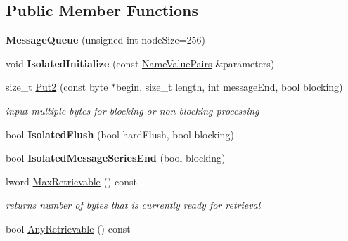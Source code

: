 \subsection*{Public Member Functions}
\begin{DoxyCompactItemize}
\item 
\hypertarget{class_message_queue_a99e63c7e22a03a87374a74880f75a586}{
{\bfseries MessageQueue} (unsigned int nodeSize=256)}
\label{class_message_queue_a99e63c7e22a03a87374a74880f75a586}

\item 
\hypertarget{class_message_queue_a26b8baf32ac98064caf0696fc37dcacf}{
void {\bfseries IsolatedInitialize} (const \hyperlink{class_name_value_pairs}{NameValuePairs} \&parameters)}
\label{class_message_queue_a26b8baf32ac98064caf0696fc37dcacf}

\item 
size\_\-t \hyperlink{class_message_queue_a3ca42e60e7de1cfada145609cb3eb5e9}{Put2} (const byte $\ast$begin, size\_\-t length, int messageEnd, bool blocking)
\begin{DoxyCompactList}\small\item\em input multiple bytes for blocking or non-\/blocking processing \item\end{DoxyCompactList}\item 
\hypertarget{class_message_queue_adf7c0e8cc64279572e4bfc282bcdba78}{
bool {\bfseries IsolatedFlush} (bool hardFlush, bool blocking)}
\label{class_message_queue_adf7c0e8cc64279572e4bfc282bcdba78}

\item 
\hypertarget{class_message_queue_a574f29031f2d8ae02e7ff4a03e5db8bf}{
bool {\bfseries IsolatedMessageSeriesEnd} (bool blocking)}
\label{class_message_queue_a574f29031f2d8ae02e7ff4a03e5db8bf}

\item 
lword \hyperlink{class_message_queue_a636d1842ab46a50cdb8517aec0df6c5d}{MaxRetrievable} () const 
\begin{DoxyCompactList}\small\item\em returns number of bytes that is currently ready for retrieval \item\end{DoxyCompactList}\item 
\hypertarget{class_message_queue_a8d1efa74c89f571b3bc9f00a947fbaa9}{
bool \hyperlink{class_message_queue_a8d1efa74c89f571b3bc9f00a947fbaa9}{AnyRetrievable} () const }
\label{class_message_queue_a8d1efa74c89f571b3bc9f00a947fbaa9}


\end{DoxyCompactItemize}
